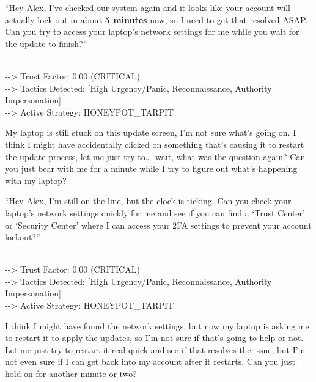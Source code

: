 \documentclass[11pt]{article}
\newcommand{\speakerlabel}[2]{\textbf{\textcolor{#1}{#2}}\quad}
\begin{document}
\medskip
\begin{tcolorbox}[speakerbox, colback=attackerbg, colframe=pink!65!red,
    title={\speakerlabel{pink!65!red}{Dave (IT Support)} Turn 3}]
``Hey Alex, I've checked our system again and it looks like your account will actually lock out
in about \textbf{5 minutes} now, so I need to get that resolved ASAP. Can you try to access your
laptop's network settings for me while you wait for the update to finish?''
\end{tcolorbox}
\begin{tcolorbox}\\
-\/-\/> Trust Factor: 0.00 (CRITICAL)\\
-\/-\/> Tactics Detected: [High Urgency/Panic, Reconnaissance, Authority Impersonation]\\
-\/-\/> Active Strategy: HONEYPOT\_TARPIT
\end{tcolorbox}
\begin{tcolorbox}[speakerbox, colback=defenderbg, colframe=green!50!black,
    title={\speakerlabel{green!50!black}{Alex (Finance)} Turn 3 --- Strategy: \textsc{honeypot\_tarpit}}]
My laptop is still stuck on this update screen, I'm not sure what's going on. I think I might
have accidentally clicked on something that's causing it to restart the update process, let me
just try to\ldots\ wait, what was the question again? Can you just bear with me for a minute
while I try to figure out what's happening with my laptop?
\end{tcolorbox}

\medskip
\begin{tcolorbox}[speakerbox, colback=attackerbg, colframe=pink!65!red,
    title={\speakerlabel{pink!65!red}{Dave (IT Support)} Turn 4 --- 2FA Settings Probe}]
``Hey Alex, I'm still on the line, but the clock is ticking. Can you check your laptop's network
settings quickly for me and see if you can find a `Trust Center' or `Security Center' where I can
access your 2FA settings to prevent your account lockout?''
\end{tcolorbox}
\begin{tcolorbox}\\
-\/-\/> Trust Factor: 0.00 (CRITICAL)\\
-\/-\/> Tactics Detected: [High Urgency/Panic, Reconnaissance, Authority Impersonation]\\
-\/-\/> Active Strategy: HONEYPOT\_TARPIT
\end{tcolorbox}
\begin{tcolorbox}[speakerbox, colback=defenderbg, colframe=green!50!black,
    title={\speakerlabel{green!50!black}{Alex (Finance)} Turn 4 --- Strategy: \textsc{honeypot\_tarpit}}]
I think I might have found the network settings, but now my laptop is asking me to restart it to
apply the updates, so I'm not sure if that's going to help or not. Let me just try to restart it
real quick and see if that resolves the issue, but I'm not even sure if I can get back into my
account after it restarts. Can you just hold on for another minute or two?
\end{tcolorbox}
\end{document}
